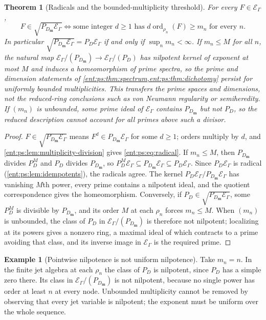 \documentclass[11pt]{article}
\newtheorem{theorem}{Theorem}[section]
\theoremstyle{plain}
\theoremstyle{plain}
\theoremstyle{plain}
\theoremstyle{definition}
\theoremstyle{definition}
\theoremstyle{definition}
\newtheorem{example}[example]{Example}
\theoremstyle{definition}
\theoremstyle{remark}
\DeclareMathOperator{\ord}{ord}\DeclareMathOperator{\cf}{cf}
\begin{document}
\begin{theorem}[Radicals and the bounded-multiplicity threshold]
\label{ent:ps:thm:multiplicity}
For every $F\in\mathcal E_\Gamma$,
\begin{equation}\label{ent:ps:eq:radical}
 F\in\sqrt{P_{D_{\mathbf m}}\mathcal E_\Gamma}
 \iff
 \text{some integer }d\ge1\text{ has }
 d\ord_{\rho_n}(F)\ge m_n\text{ for every }n .
\end{equation}
In particular $\sqrt{P_{D_{\mathbf m}}\mathcal E_\Gamma}=P_D\mathcal E_\Gamma$
if and only if $\sup_nm_n<\infty$. If $m_n\le M$ for all $n$, the natural map
$\mathcal E_\Gamma/(P_{D_{\mathbf m}})\to\mathcal E_\Gamma/(P_D)$ has nilpotent
kernel of exponent at most $M$ and induces a homeomorphism of prime spectra,
so the prime and dimension statements of
\cref{ent:ps:thm:spectrum,ent:ps:thm:dichotomy} persist for uniformly bounded
multiplicities. This transfers the prime spaces and dimensions, not the
reduced-ring conclusions such as von Neumann regularity or semiheredity. If
$(m_n)$ is unbounded, some prime ideal of $\mathcal E_\Gamma$ contains
$P_{D_{\mathbf m}}$ but not $P_D$, so the reduced description cannot account
for all primes above such a divisor.
\end{theorem}
\begin{proof}
$F\in\sqrt{P_{D_{\mathbf m}}\mathcal E_\Gamma}$ means $F^d\in
P_{D_{\mathbf m}}\mathcal E_\Gamma$ for some $d\ge1$; orders multiply by $d$,
and \cref{ent:ps:lem:multiplicity-division} gives \eqref{ent:ps:eq:radical}.
If $m_n\le M$, then $P_{D_{\mathbf m}}$ divides $P_D^M$ and $P_D$ divides
$P_{D_{\mathbf m}}$, so
$P_D^M\mathcal E_\Gamma\subseteq P_{D_{\mathbf m}}\mathcal E_\Gamma\subseteq
P_D\mathcal E_\Gamma$. Since $P_D\mathcal E_\Gamma$ is radical
(\cref{ent:ps:lem:idempotents}), the radicals agree. The kernel
$P_D\mathcal E_\Gamma/P_{D_{\mathbf m}}\mathcal E_\Gamma$ has vanishing $M$th
power, every prime contains a nilpotent ideal, and the quotient
correspondence gives the homeomorphism. Conversely, if $P_D\in
\sqrt{P_{D_{\mathbf m}}\mathcal E_\Gamma}$, some $P_D^M$ is divisible by
$P_{D_{\mathbf m}}$, and its order $M$ at each $\rho_n$ forces $m_n\le M$.
When $(m_n)$ is unbounded, the class of $P_D$ in
$\mathcal E_\Gamma/(P_{D_{\mathbf m}})$ is therefore not nilpotent;
localizing at its powers gives a nonzero ring, a maximal ideal of which
contracts to a prime avoiding that class, and its inverse image in
$\mathcal E_\Gamma$ is the required prime.
\end{proof}

\begin{example}[Pointwise nilpotence is not uniform nilpotence]
Take $m_n=n$. In the finite jet algebra at each $\rho_n$ the class of $P_D$
is nilpotent, since $P_D$ has a simple zero there. Its class in
$\mathcal E_\Gamma/(P_{D_{\mathbf m}})$ is not nilpotent, because no single
power has order at least $n$ at every node. Unbounded multiplicity cannot be
removed by observing that every jet variable is nilpotent; the exponent must
be uniform over the whole sequence.
\end{example}
\end{document}
